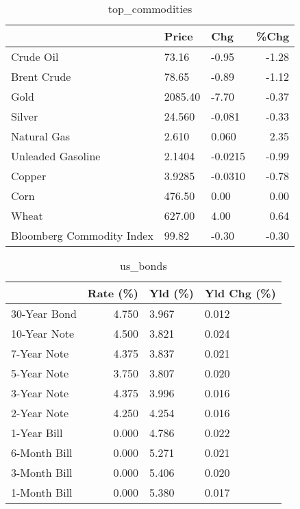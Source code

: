 \documentclass{article}%
\begin{document}
\begin{table}[htbp]%
\caption{top\_commodities}%
\centering%
\begin{adjustbox}{width=1\textwidth}%
\begin{tabular}{lllr}
\toprule
                          &   Price &     Chg &  \%Chg \\
\midrule
               Crude Oil  &   73.16 &   -0.95 & -1.28 \\
             Brent Crude  &   78.65 &   -0.89 & -1.12 \\
                    Gold  & 2085.40 &   -7.70 & -0.37 \\
                  Silver  &  24.560 &  -0.081 & -0.33 \\
             Natural Gas  &   2.610 &   0.060 &  2.35 \\
       Unleaded Gasoline  &  2.1404 & -0.0215 & -0.99 \\
                  Copper  &  3.9285 & -0.0310 & -0.78 \\
                    Corn  &  476.50 &    0.00 &  0.00 \\
                   Wheat  &  627.00 &    4.00 &  0.64 \\
Bloomberg Commodity Index &   99.82 &   -0.30 & -0.30 \\
\bottomrule
\end{tabular}
%
\end{adjustbox}%
\end{table}

%


\begin{table}[htbp]%
\caption{us\_bonds}%
\centering%
\begin{adjustbox}{width=1\textwidth}%
\begin{tabular}{lrll}
\toprule
             &  Rate (\%) & Yld (\%) & Yld Chg (\%) \\
\midrule
30-Year Bond &     4.750 &   3.967 &       0.012 \\
10-Year Note &     4.500 &   3.821 &       0.024 \\
 7-Year Note &     4.375 &   3.837 &       0.021 \\
 5-Year Note &     3.750 &   3.807 &       0.020 \\
 3-Year Note &     4.375 &   3.996 &       0.016 \\
 2-Year Note &     4.250 &   4.254 &       0.016 \\
 1-Year Bill &     0.000 &   4.786 &       0.022 \\
6-Month Bill &     0.000 &   5.271 &       0.021 \\
3-Month Bill &     0.000 &   5.406 &       0.020 \\
1-Month Bill &     0.000 &   5.380 &       0.017 \\
\bottomrule
\end{tabular}
%
\end{adjustbox}%
\end{table}
\end{document}
